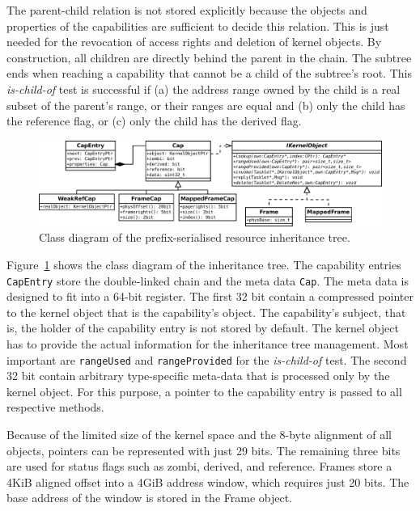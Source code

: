 The parent-child relation is not stored explicitly because the objects and properties of the capabilities are sufficient to decide this relation. This is just needed for the revocation of access rights and deletion of kernel objects. By construction, all children are directly behind the parent in the chain. The subtree ends when reaching a capability that cannot be a child of the subtree's root. This \emph{is-child-of} test is successful if (a) the address range owned by the child is a real subset of the parent's range, or their ranges are equal and (b) only the child has the reference flag, or (c) only the child has the derived flag.

\begin{figure}
  \centering
  \includegraphics[scale=0.25]{fig/kernel-object-cap.pdf}
  \caption{Class diagram of the prefix-serialised resource inheritance tree.}
  \label{fig:kernel-object-cap}
\end{figure}

Figure~\ref{fig:kernel-object-cap} shows the class diagram of the inheritance tree. The capability entries \texttt{CapEntry} store the double-linked chain and the meta data \texttt{Cap}. The meta data is designed to fit into a 64-bit register. The first 32 bit contain a compressed pointer to the kernel object that is the capability's object. The capability's subject, that is, the holder of the capability entry is not stored by default. The kernel object has to provide the actual information for the inheritance tree management. Most important are \texttt{rangeUsed} and \texttt{rangeProvided} for the \emph{is-child-of} test. The second 32 bit contain arbitrary type-specific meta-data that is processed only by the kernel object. For this purpose, a pointer to the capability entry is passed to all respective methods.

Because of the limited size of the kernel space and the 8-byte alignment of all objects, pointers can be represented with just 29 bits. The remaining three bits are used for status flags such as zombi, derived, and reference. Frames store a 4KiB aligned offset into a 4GiB address window, which requires just 20 bits. The base address of the window is stored in the Frame object.

